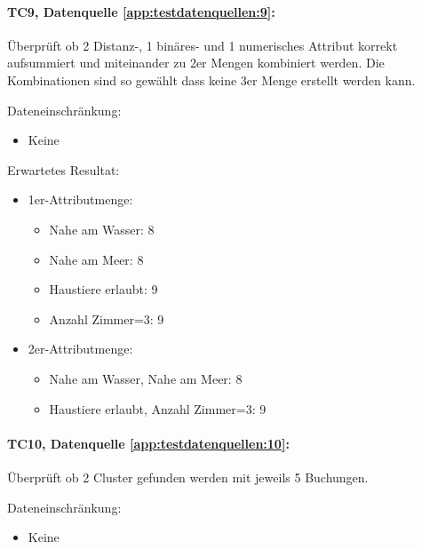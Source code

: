 \paragraph{TC9, Datenquelle \cref{app:testdatenquellen:9}:} Überprüft ob 2 Distanz-, 1 binäres- und 1 numerisches Attribut korrekt aufsummiert und miteinander zu 2er Mengen kombiniert werden. Die Kombinationen sind so gewählt dass keine 3er Menge erstellt werden kann.

Dateneinschränkung:
\begin{itemize}
	\item Keine
\end{itemize}

Erwartetes Resultat:
\begin{itemize}
	\item 1er-Attributmenge:
	\begin{itemize}
		\item Nahe am Wasser: 8
		\item Nahe am Meer: 8
		\item Haustiere erlaubt: 9
		\item Anzahl Zimmer=3: 9
	\end{itemize}
	\item 2er-Attributmenge:
	\begin{itemize}
		\item Nahe am Wasser, Nahe am Meer: 8
		\item Haustiere erlaubt, Anzahl Zimmer=3: 9
	\end{itemize}
\end{itemize}

\paragraph{TC10, Datenquelle \cref{app:testdatenquellen:10}:} Überprüft ob 2 Cluster gefunden werden mit jeweils 5 Buchungen. 

Dateneinschränkung:
\begin{itemize}
	\item Keine
\end{itemize}

